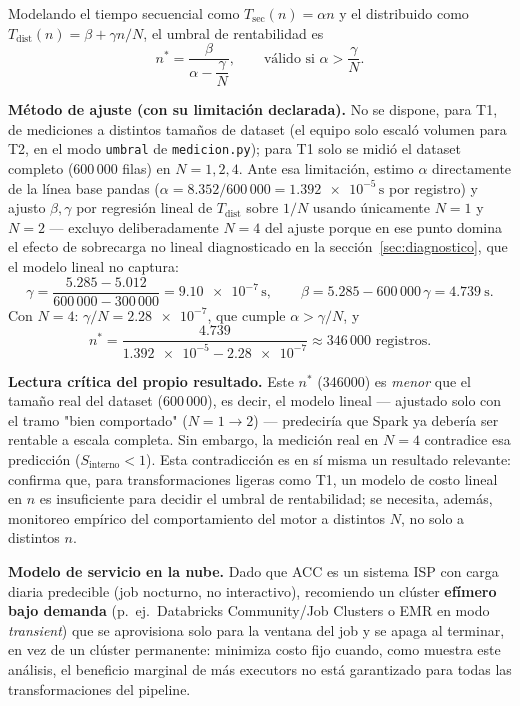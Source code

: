 \documentclass[11pt,a4paper]{article}
\begin{document}
Modelando el tiempo secuencial como $T_{\text{sec}}(n) = \alpha n$ y el
distribuido como $T_{\text{dist}}(n) = \beta + \gamma n / N$, el umbral de
rentabilidad es
\begin{equation}
  n^* = \frac{\beta}{\alpha - \dfrac{\gamma}{N}}, \qquad
  \text{válido si } \alpha > \frac{\gamma}{N}.
  \label{eq:umbral}
\end{equation}

\textbf{Método de ajuste (con su limitación declarada).} No se dispone, para T1,
de mediciones a distintos tamaños de dataset (el equipo solo escaló volumen para
T2, en el modo \texttt{umbral} de \texttt{medicion.py}); para T1 solo se midió el
dataset completo (600\,000 filas) en $N=1,2,4$. Ante esa limitación, estimo
$\alpha$ directamente de la línea base pandas ($\alpha = 8.352/600\,000 =
\num{1.392e-5}\,\si{\second}$ por registro) y ajusto $\beta,\gamma$ por regresión
lineal de $T_{\text{dist}}$ sobre $1/N$ usando únicamente $N=1$ y $N=2$ ---
excluyo deliberadamente $N=4$ del ajuste porque en ese punto domina el efecto de
sobrecarga no lineal diagnosticado en la sección~\ref{sec:diagnostico}, que el
modelo lineal no captura:
\[
  \gamma = \frac{5.285 - 5.012}{600\,000 - 300\,000} = \num{9.10e-7}\,\si{\second},
  \qquad
  \beta = 5.285 - 600\,000\,\gamma = \SI{4.739}{\second}.
\]
Con $N=4$: $\gamma/N = \num{2.28e-7}$, que cumple $\alpha > \gamma/N$, y
\[
  n^* = \frac{4.739}{\num{1.392e-5} - \num{2.28e-7}} \approx 346\,000 \text{ registros}.
\]

\textbf{Lectura crítica del propio resultado.} Este $n^*$ (\num{346000}) es
\emph{menor} que el tamaño real del dataset (600\,000), es decir, el modelo
lineal --- ajustado solo con el tramo "bien comportado" ($N{=}1\to2$) ---
predeciría que Spark ya debería ser rentable a escala completa. Sin embargo, la
medición real en $N=4$ contradice esa predicción ($S_{\text{interno}}<1$). Esta
contradicción es en sí misma un resultado relevante: confirma que, para
transformaciones ligeras como T1, un modelo de costo lineal en $n$ es
insuficiente para decidir el umbral de rentabilidad; se necesita, además,
monitoreo empírico del comportamiento del motor a distintos $N$, no solo a
distintos $n$.

\textbf{Modelo de servicio en la nube.} Dado que ACC es un sistema ISP con carga
diaria predecible (job nocturno, no interactivo), recomiendo un clúster
\textbf{efímero bajo demanda} (p.\ ej.\ Databricks Community/Job Clusters o EMR en
modo \textit{transient}) que se aprovisiona solo para la ventana del job y se
apaga al terminar, en vez de un clúster permanente: minimiza costo fijo cuando,
como muestra este análisis, el beneficio marginal de más executors no está
garantizado para todas las transformaciones del pipeline.
\end{document}
